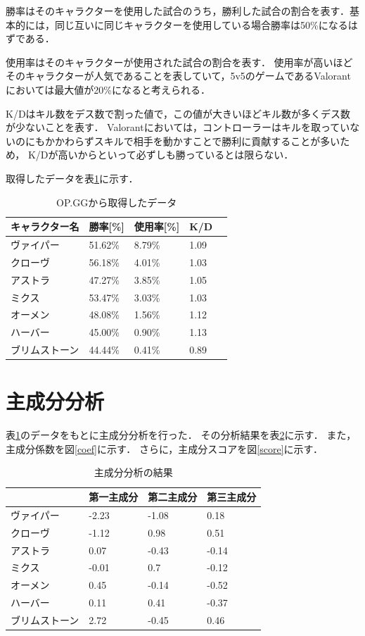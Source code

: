 \documentclass[titlepage,a4paper]{jsarticle}
\begin{document}
  勝率はそのキャラクターを使用した試合のうち，勝利した試合の割合を表す．基本的には，同じ互いに同じキャラクターを使用している場合勝率は50\%になるはずである．

  使用率はそのキャラクターが使用された試合の割合を表す．
使用率が高いほどそのキャラクターが人気であることを表していて，5v5のゲームであるValorantにおいては最大値が20\%になると考えられる．

  K/Dはキル数をデス数で割った値で，この値が大きいほどキル数が多くデス数が少ないことを表す．
Valorantにおいては，コントローラーはキルを取っていないのにもかかわらずスキルで相手を動かすことで勝利に貢献することが多いため，
K/Dが高いからといって必ずしも勝っているとは限らない．

取得したデータを表\ref{data}に示す．
\begin{table}[H]
\centering
\caption{OP.GGから取得したデータ}
\label{data}
  \begin{tabular}{l|llll}\hline
  キャラクター名 & 勝率[\%] & 使用率[\%] & K/D &  \\\hline\hline
  ヴァイパー   & 51.62\% & 8.79\% & 1.09 &  \\
  クローヴ    & 56.18\% & 4.01\% & 1.03 &  \\
  アストラ    & 47.27\% & 3.85\% & 1.05 &  \\
  ミクス     & 53.47\% & 3.03\% & 1.03 &  \\
  オーメン    & 48.08\% & 1.56\% & 1.12 &  \\
  ハーバー    & 45.00\% & 0.90\% & 1.13 &  \\
  ブリムストーン & 44.44\% & 0.41\% & 0.89 & \\\hline
  \end{tabular}
\end{table}
\section{主成分分析}
  表\ref{data}のデータをもとに主成分分析を行った．
その分析結果を表\ref{pca}に示す．
また，主成分係数を図\ref{coef}に示す．
さらに，主成分スコアを図\ref{score}に示す．
\begin{table}[H]
\centering
\caption{主成分分析の結果}
\label{pca}
\begin{tabular}{l|lll}\hline
        & 第一主成分  & 第二主成分  & 第三主成分 \\\hline\hline
ヴァイパー   & -2.23 & -1.08 & 0.18     \\
クローヴ    & -1.12 & 0.98  & 0.51     \\
アストラ    & 0.07  & -0.43 & -0.14    \\
ミクス     & -0.01 & 0.7   & -0.12    \\
オーメン    & 0.45  & -0.14 & -0.52    \\
ハーバー    & 0.11  & 0.41  & -0.37    \\
ブリムストーン & 2.72  & -0.45 & 0.46    \\\hline
\end{tabular}
\end{table}
\end{document}
